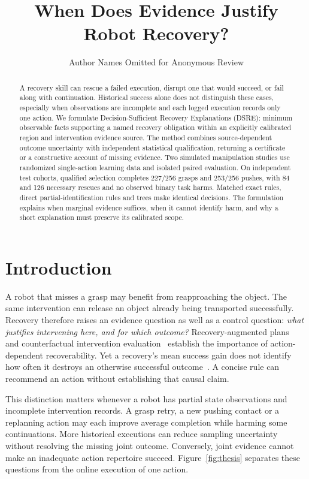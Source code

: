 \documentclass[conference]{IEEEtran}
\title{When Does Evidence Justify Robot Recovery?}
\author{Author Names Omitted for Anonymous Review}
\begin{document}
\maketitle
\begin{abstract}
A recovery skill can rescue a failed execution, disrupt one that would succeed, or fail along with continuation. Historical success alone does not distinguish these cases, especially when observations are incomplete and each logged execution records only one action. We formulate Decision-Sufficient Recovery Explanations (DSRE): minimum observable facts supporting a named recovery obligation within an explicitly calibrated region and intervention evidence source. The method combines source-dependent outcome uncertainty with independent statistical qualification, returning a certificate or a constructive account of missing evidence. Two simulated manipulation studies use randomized single-action learning data and isolated paired evaluation. On independent test cohorts, qualified selection completes 227/256 grasps and 253/256 pushes, with 84 and 126 necessary rescues and no observed binary task harms. Matched exact rules, direct partial-identification rules and trees make identical decisions. The formulation explains when marginal evidence suffices, when it cannot identify harm, and why a short explanation must preserve its calibrated scope.
\end{abstract}

\section{Introduction}
A robot that misses a grasp may benefit from reapproaching the object. The same intervention can release an object already being transported successfully. Recovery therefore raises an evidence question as well as a control question: \emph{what justifies intervening here, and for which outcome?} Recovery-augmented plans~\cite{agentchord} and counterfactual intervention evaluation~\cite{rescue} establish the importance of action-dependent recoverability. Yet a recovery's mean success gain does not identify how often it destroys an otherwise successful outcome~\cite{kallus2022,li2023}. A concise rule can recommend an action without establishing that causal claim.

This distinction matters whenever a robot has partial state observations and incomplete intervention records. A grasp retry, a new pushing contact or a replanning action may each improve average completion while harming some continuations. More historical executions can reduce sampling uncertainty without resolving the missing joint outcome. Conversely, joint evidence cannot make an inadequate action repertoire succeed. Figure~\ref{fig:thesis} separates these questions from the online execution of one action.
\end{document}

